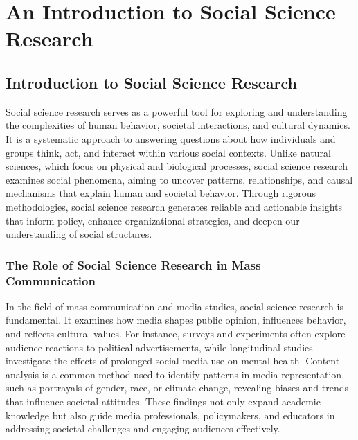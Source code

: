 \documentclass[
]{book}
\begin{document}
\chapter{\texorpdfstring{\textbf{An Introduction to Social Science Research}}{An Introduction to Social Science Research}}\label{an-introduction-to-social-science-research}

\section{Introduction to Social Science Research}\label{introduction-to-social-science-research}

Social science research serves as a powerful tool for exploring and understanding the complexities of human behavior, societal interactions, and cultural dynamics. It is a systematic approach to answering questions about how individuals and groups think, act, and interact within various social contexts. Unlike natural sciences, which focus on physical and biological processes, social science research examines social phenomena, aiming to uncover patterns, relationships, and causal mechanisms that explain human and societal behavior. Through rigorous methodologies, social science research generates reliable and actionable insights that inform policy, enhance organizational strategies, and deepen our understanding of social structures.

\subsection*{The Role of Social Science Research in Mass Communication}\label{the-role-of-social-science-research-in-mass-communication}

In the field of mass communication and media studies, social science research is fundamental. It examines how media shapes public opinion, influences behavior, and reflects cultural values. For instance, surveys and experiments often explore audience reactions to political advertisements, while longitudinal studies investigate the effects of prolonged social media use on mental health. Content analysis is a common method used to identify patterns in media representation, such as portrayals of gender, race, or climate change, revealing biases and trends that influence societal attitudes. These findings not only expand academic knowledge but also guide media professionals, policymakers, and educators in addressing societal challenges and engaging audiences effectively.
\end{document}
